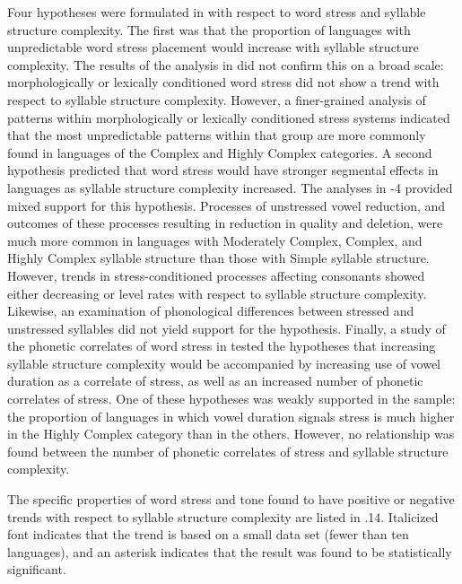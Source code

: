   Four hypotheses were formulated in  with respect to word stress and syllable structure complexity. The first was that the proportion of languages with unpredictable word stress placement would increase with syllable structure complexity. The results of the analysis in  did not confirm this on a broad scale: morphologically or lexically conditioned word stress did not show a trend with respect to syllable structure complexity. However, a finer-grained analysis of patterns within morphologically or lexically conditioned stress systems indicated that the most unpredictable patterns within that group are more commonly found in languages of the Complex and Highly Complex categories. A second hypothesis predicted that word stress would have stronger segmental effects in languages as syllable structure complexity increased. The analyses in -4 provided mixed support for this hypothesis. Processes of unstressed vowel reduction, and outcomes of these processes resulting in reduction in quality and deletion, were much more common in languages with Moderately Complex, Complex, and Highly Complex syllable structure than those with Simple syllable structure. However, trends in stress-conditioned processes affecting consonants showed either decreasing or level rates with respect to syllable structure complexity. Likewise, an examination of phonological differences between stressed and unstressed syllables did not yield support for the hypothesis. Finally, a study of the phonetic correlates of word stress in  tested the hypotheses that increasing syllable structure complexity would be accompanied by increasing use of vowel duration as a correlate of stress, as well as an increased number of phonetic correlates of stress. One of these hypotheses was weakly supported in the sample: the proportion of languages in which vowel duration signals stress is much higher in the Highly Complex category than in the others. However, no relationship was found between the number of phonetic correlates of stress and syllable structure complexity.

  The specific properties of word stress and tone found to have positive or negative trends with respect to syllable structure complexity are listed in .14. Italicized font indicates that the trend is based on a small data set (fewer than ten languages), and an asterisk indicates that the result was found to be statistically significant.

